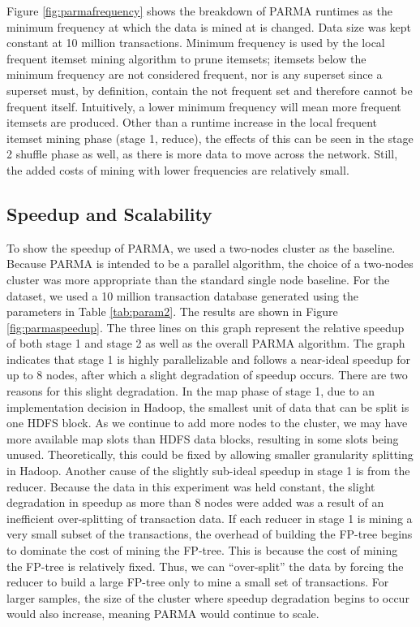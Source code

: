 Figure \ref{fig:parmafrequency} shows the breakdown of PARMA runtimes as
the minimum frequency at which the data is mined at is changed. Data
size was kept constant at 10 million transactions. Minimum frequency
is used by the local frequent itemset mining algorithm to prune
itemsets; itemsets below the minimum frequency are not considered
frequent, nor is any superset since a superset must, by definition,
contain the not frequent set and therefore cannot be frequent
itself. Intuitively, a lower minimum frequency will mean more frequent
itemsets are produced. Other than a runtime increase in the local
frequent itemset mining phase (stage 1, reduce), the effects of this
can be seen in the stage 2 shuffle phase as well, as there is more
data to move across the network. Still, the added costs of mining with
lower frequencies are relatively small.

\subsection{Speedup and Scalability}
To show the speedup of PARMA, we used a two-nodes cluster as the
baseline. Because PARMA is intended to be a parallel algorithm, the choice of a
two-nodes cluster was more appropriate than the standard single node
baseline. For the dataset, we used a 10 million transaction database
generated using the parameters in Table \ref{tab:param2}. The results
are shown in Figure \ref{fig:parmaspeedup}. The three lines on this graph
represent the relative speedup of both stage 1 and stage 2 as well as
the overall PARMA algorithm. The graph indicates that stage 1 is highly
parallelizable and follows a near-ideal speedup for up to 8 nodes,
after which a slight degradation of speedup occurs. There are two
reasons for this slight degradation. In the map phase of stage 1, due
to an implementation decision in Hadoop, the smallest unit of data
that can be split is one HDFS block. As we continue to add more nodes
to the cluster, we may have more available map slots than HDFS data
blocks, resulting in some slots being unused. Theoretically, this
could be fixed by allowing smaller granularity splitting in
Hadoop. Another cause of the slightly sub-ideal speedup in stage 1 is
from the reducer. Because the data in this experiment was held
constant, the slight degradation in speedup as more than 8 nodes were
added was a result of an inefficient over-splitting of transaction
data. If each reducer in stage 1 is mining a very small subset of the
transactions, the overhead of building the FP-tree begins to dominate
the cost of mining the FP-tree. This is because the cost of mining the
FP-tree is relatively fixed. Thus, we can ``over-split'' the data by
forcing the reducer to build a large FP-tree only to mine a small set
of transactions. For larger samples, the size of the cluster where
speedup degradation begins to occur would also increase, meaning PARMA
would continue to scale.

